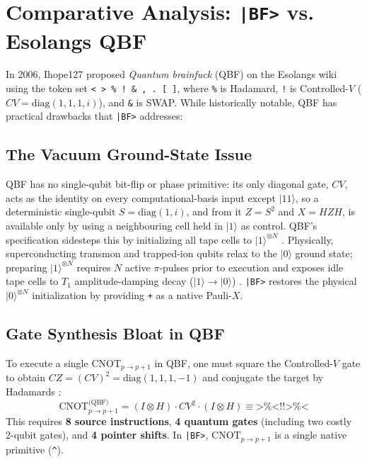 \documentclass[11pt,a4paper,twocolumn]{article}
\newcommand{\ket}[1]{| #1 \rangle}
\begin{document}
\section{Comparative Analysis: \texttt{|BF>} vs. Esolangs QBF}

In 2006, Ihope127 proposed \emph{Quantum brainfuck} (QBF) on the Esolangs wiki \cite{ihope2006qbf} using the token set \texttt{< > \% ! \& , . [ ]}, where \texttt{\%} is Hadamard, \texttt{!} is Controlled-$V$ ($CV = \text{diag}(1,1,1,i)$), and \texttt{\&} is SWAP. While historically notable, QBF has practical drawbacks that \texttt{|BF>} addresses:

\subsection{The Vacuum Ground-State Issue}
QBF has no single-qubit bit-flip or phase primitive: its only diagonal gate, $CV$, acts as the identity on every computational-basis input except $\ket{11}$, so a deterministic single-qubit $S = \text{diag}(1, i)$, and from it $Z = S^2$ and $X = HZH$, is available only by using a neighbouring cell held in $\ket{1}$ as control. QBF's specification sidesteps this by initializing all tape cells to $\ket{1}^{\otimes N}$ \cite{ihope2006qbf}. Physically, superconducting transmon and trapped-ion qubits relax to the $\ket{0}$ ground state; preparing $\ket{1}^{\otimes N}$ requires $N$ active $\pi$-pulses prior to execution and exposes idle tape cells to $T_1$ amplitude-damping decay ($\ket{1} \to \ket{0}$) \cite{preskill2018nisq}. \texttt{|BF>} restores the physical $\ket{0}^{\otimes N}$ initialization by providing \texttt{+} as a native Pauli-$X$.

\subsection{Gate Synthesis Bloat in QBF}
To execute a single $\text{CNOT}_{p \to p+1}$ in QBF, one must square the Controlled-$V$ gate to obtain $CZ = (CV)^2 = \text{diag}(1,1,1,-1)$ and conjugate the target by Hadamards \cite{barenco1995elementary}:
\begin{equation}
    \text{CNOT}_{p \to p+1}^{\text{(QBF)}} = (I \otimes H) \cdot CV^2 \cdot (I \otimes H) \equiv \texttt{>\%<!!>\%<}
\end{equation}
This requires \textbf{8 source instructions}, \textbf{4 quantum gates} (including two costly 2-qubit gates), and \textbf{4 pointer shifts}. In \texttt{|BF>}, $\text{CNOT}_{p \to p+1}$ is a single native primitive (\texttt{\^{}}).
\end{document}
